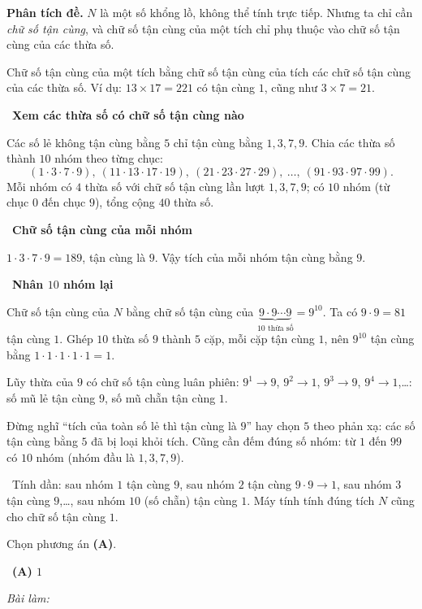 \documentclass[11pt]{article}
\newif\ifsol \solfalse
\providecommand{\AnsWord}{Đáp số}
\newcommand{\StuProb}[2]{\begin{probboxS}{#1}{#2}\StuProbBody\end{probboxS}}
\newcommand{\ans}[1]{\par\smallskip{\bfseries\color{tmGreen!88!black}\AnsWord:}\ {\bfseries\color{AnsRed}#1}\par}
\newcommand{\probsol}[1]{%
  \begin{lrbox}{\solmeasure}\begin{minipage}{\dimexpr\linewidth-24pt\relax}#1\end{minipage}\end{lrbox}%
  \ifsol
    \begin{solbox}#1\end{solbox}%
  \else
    \setlength{\solht}{\dimexpr\ht\solmeasure+\dp\solmeasure+0.85cm\relax}%
    \ifdim\solht<1.35cm\setlength{\solht}{1.35cm}\fi
    \ifdim\solht>\StudentMaxWork\setlength{\solht}{\StudentMaxWork}\fi
    \par\noindent\begin{minipage}{\linewidth}%
    \expandafter\StuProb\StuProbArgs
    \begin{tcolorbox}[colback=white,colframe=Line,boxrule=0.8pt,arc=5pt,
      left=8pt,right=8pt,top=4pt,bottom=4pt,height=\solht]{\footnotesize\color{Slate}\itshape\WorkWord}\end{tcolorbox}%
    \end{minipage}\par\medskip
  \fi}
\newlength{\StudentMaxWork}\setlength{\StudentMaxWork}{4.5cm}
\newcommand{\step}[2]{\par\smallskip\noindent{\bfseries\color{tmBlue!85!black}\StepWord~#1.}\ {\bfseries #2}\par\nopagebreak}
\newcommand{\verify}[1]{\par\smallskip\noindent{\bfseries\color{tmGreen!80!black}\faCheckCircle\ \CheckWord}\ #1\par}
\def\WorkWord{Bài làm:}
\def\AnsWord{Đáp số}
\def\StepWord{Bước}
\def\CheckWord{Thử lại:}
\begin{document}
\probsol{
\textbf{Phân tích đề.} $N$ là một số khổng lồ, không thể tính trực tiếp. Nhưng ta chỉ cần \emph{chữ số tận cùng}, và chữ số tận cùng của một tích chỉ phụ thuộc vào chữ số tận cùng của các thừa số.

\begin{recallbox}Chữ số tận cùng của một tích bằng chữ số tận cùng của tích các chữ số tận cùng của các thừa số. Ví dụ: $13\times 17=221$ có tận cùng $1$, cũng như $3\times 7=21$.\end{recallbox}

\step{1}{Xem các thừa số có chữ số tận cùng nào}
Các số lẻ không tận cùng bằng $5$ chỉ tận cùng bằng $1,3,7,9$. Chia các thừa số thành $10$ nhóm theo từng chục:
\[(1\cdot3\cdot7\cdot9),\ (11\cdot13\cdot17\cdot19),\ (21\cdot23\cdot27\cdot29),\ \dots,\ (91\cdot93\cdot97\cdot99).\]
Mỗi nhóm có $4$ thừa số với chữ số tận cùng lần lượt $1,3,7,9$; có $10$ nhóm (từ chục $0$ đến chục $9$), tổng cộng $40$ thừa số.

\step{2}{Chữ số tận cùng của mỗi nhóm}
$1\cdot3\cdot7\cdot9=189$, tận cùng là $9$. Vậy tích của mỗi nhóm tận cùng bằng $9$.

\step{3}{Nhân $10$ nhóm lại}
Chữ số tận cùng của $N$ bằng chữ số tận cùng của $\underbrace{9\cdot 9\cdots 9}_{10\text{ thừa số}}=9^{10}$. Ta có $9\cdot 9=81$ tận cùng $1$. Ghép $10$ thừa số $9$ thành $5$ cặp, mỗi cặp tận cùng $1$, nên $9^{10}$ tận cùng bằng $1\cdot1\cdot1\cdot1\cdot1=1$.

\begin{tipbox}Lũy thừa của $9$ có chữ số tận cùng luân phiên: $9^1\to 9$, $9^2\to 1$, $9^3\to 9$, $9^4\to 1$,\dots: số mũ lẻ tận cùng $9$, số mũ chẵn tận cùng $1$.\end{tipbox}

\begin{warnbox}Đừng nghĩ ``tích của toàn số lẻ thì tận cùng là $9$'' hay chọn $5$ theo phản xạ: các số tận cùng bằng $5$ đã bị loại khỏi tích. Cũng cần đếm đúng số nhóm: từ $1$ đến $99$ có $10$ nhóm (nhóm đầu là $1,3,7,9$).\end{warnbox}

\verify{Tính dần: sau nhóm $1$ tận cùng $9$, sau nhóm $2$ tận cùng $9\cdot9\to1$, sau nhóm $3$ tận cùng $9$,\dots, sau nhóm $10$ (số chẵn) tận cùng $1$. Máy tính tính đúng tích $N$ cũng cho chữ số tận cùng $1$.}
Chọn phương án \textbf{(A)}.
\ans{(A) $1$}
}
\end{document}
